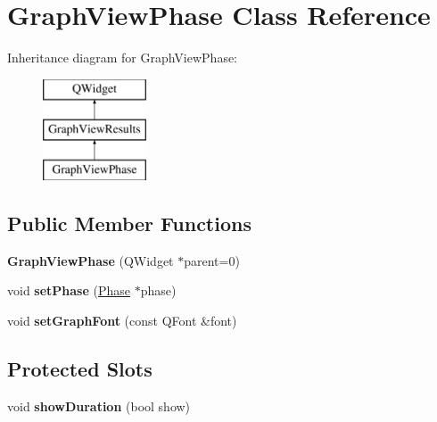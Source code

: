 \hypertarget{class_graph_view_phase}{\section{Graph\-View\-Phase Class Reference}
\label{class_graph_view_phase}
}
Inheritance diagram for Graph\-View\-Phase\-:\begin{figure}[H]
\begin{center}
\leavevmode
\includegraphics[height=3.000000cm]{class_graph_view_phase}
\end{center}
\end{figure}
\subsection*{Public Member Functions}
\begin{DoxyCompactItemize}
\item 
\hypertarget{class_graph_view_phase_a6ca7aa8a756179c8726be6f3c0a5a81b}{{\bfseries Graph\-View\-Phase} (Q\-Widget $\ast$parent=0)}\label{class_graph_view_phase_a6ca7aa8a756179c8726be6f3c0a5a81b}

\item 
\hypertarget{class_graph_view_phase_a5d706063b406ec3a010806047bbc5e2e}{void {\bfseries set\-Phase} (\hyperlink{class_phase}{Phase} $\ast$phase)}\label{class_graph_view_phase_a5d706063b406ec3a010806047bbc5e2e}

\item 
\hypertarget{class_graph_view_phase_a335c5fea73b74bc64dd5337fecfc46b2}{void {\bfseries set\-Graph\-Font} (const Q\-Font \&font)}\label{class_graph_view_phase_a335c5fea73b74bc64dd5337fecfc46b2}

\end{DoxyCompactItemize}
\subsection*{Protected Slots}
\begin{DoxyCompactItemize}
\item 
\hypertarget{class_graph_view_phase_a136e2a670090aafee4f36863bb7af873}{void {\bfseries show\-Duration} (bool show)}\label{class_graph_view_phase_a136e2a670090aafee4f36863bb7af873}

\end{DoxyCompactItemize}
